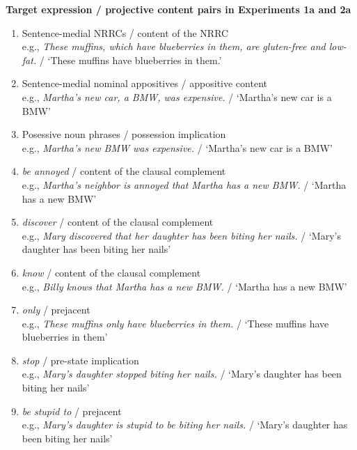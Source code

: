\documentclass[11pt,fleqn]{article}
\newcommand{\6}{\mbox{$[\hspace*{-.6mm}[$}}
\newcommand{\9}{\mbox{$]\hspace*{-.6mm}]$}}
\begin{document}
\begin{exe}
\ex\label{pairs1a2a} {\bf Target expression / projective content pairs in Experiments 1a and 2a}

\begin{enumerate}[itemsep=-.5mm]

\item Sentence-medial NRRCs / content of the NRRC
\\ e.g., {\em These muffins, which have blueberries in them, are gluten-free and low-fat.} / `These muffins have blueberries in them.'

\item Sentence-medial nominal appositives / appositive content
\\ e.g., {\em Martha's new car, a BMW, was expensive.} / `Martha's new car is a BMW'

\item Posessive noun phrases / possession implication
\\ e.g., {\em Martha's new BMW was expensive.} / `Martha's new car is a BMW'

\item {\em be annoyed} / content of the clausal complement
\\ e.g., {\em Martha's neighbor is annoyed that Martha has a new BMW.} / `Martha has a new BMW'

\item {\em discover} / content of the clausal complement
\\ e.g., {\em Mary discovered that her daughter has been biting her nails.} / `Mary's daughter has been biting her nails'

\item {\em know} / content of the clausal complement
\\ e.g., {\em Billy knows that Martha has a new BMW.} /  `Martha has a new BMW'

\item {\em only} / prejacent
\\ e.g., {\em These muffins only have blueberries in them.} / `These muffins have blueberries in them'

\item {\em stop} / pre-state implication
\\ e.g., {\em Mary's daughter stopped biting her nails.}  / `Mary's daughter has been biting her nails'

\item {\em be stupid to} / prejacent
\\ e.g., {\em Mary's daughter is stupid to be biting her nails.} / `Mary's daughter has been biting her nails'


\end{enumerate}
\end{exe}
\end{document}
